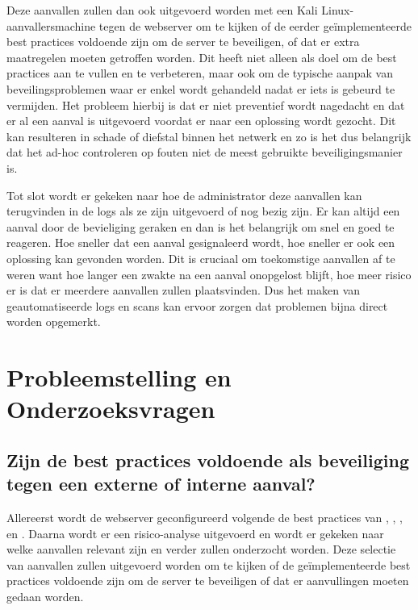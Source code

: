 \documentclass[pdftex,a4paper,12pt]{report}
\begin{document}
Deze aanvallen zullen dan ook uitgevoerd worden met een Kali Linux-aanvallersmachine tegen de webserver om te kijken of de eerder geïmplementeerde best practices voldoende zijn om de server te beveiligen, of dat er extra maatregelen moeten getroffen worden. Dit heeft niet alleen als doel om de best practices aan te vullen en te verbeteren, maar ook om de typische aanpak van beveilingsproblemen waar er enkel wordt gehandeld nadat er iets is gebeurd te vermijden. Het probleem hierbij is dat er niet preventief wordt nagedacht en dat er al een aanval is uitgevoerd voordat er naar een oplossing wordt gezocht. Dit kan resulteren in schade of diefstal binnen het netwerk en zo is het dus belangrijk dat het ad-hoc controleren op fouten niet de meest gebruikte beveiligingsmanier is. \newline

Tot slot wordt er gekeken naar hoe de administrator deze aanvallen kan terugvinden in de logs als ze zijn uitgevoerd of nog bezig zijn. Er kan altijd een aanval door de bevieliging geraken en dan is het belangrijk om snel en goed te reageren. Hoe sneller dat een aanval gesignaleerd wordt, hoe sneller er ook een oplossing kan gevonden worden. Dit is cruciaal om toekomstige aanvallen af te weren want hoe langer een zwakte na een aanval onopgelost blijft, hoe meer risico er is dat er meerdere aanvallen zullen plaatsvinden. Dus het maken van geautomatiseerde logs en scans kan ervoor zorgen dat problemen bijna direct worden opgemerkt.


\section{Probleemstelling en Onderzoeksvragen}
\label{sec:onderzoeksvragen}

\subsection{Zijn de best practices voldoende als beveiliging tegen een externe of interne aanval?}

Allereerst wordt de webserver geconfigureerd volgende de best practices van \cite{Cott2012}, \cite{Microsoft2013}, \cite{Poley2013}, \cite{Posey2011} en \cite{Vialle2012}. Daarna wordt er een risico-analyse uitgevoerd en wordt er gekeken naar welke aanvallen relevant zijn en verder zullen onderzocht worden. Deze selectie van aanvallen zullen uitgevoerd worden om te kijken of de geïmplementeerde best practices voldoende zijn om de server te beveiligen of dat er aanvullingen moeten gedaan worden. 
\end{document}

